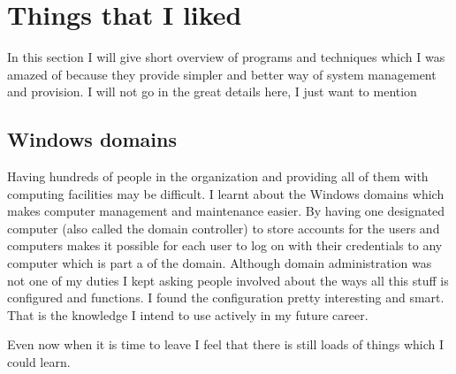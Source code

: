 \documentclass[10pt,a4paper,headinclude=true,twoside]{report}
\begin{document}
\section{Things that I liked}
In this section I will give short overview of programs and techniques which I was amazed of because they provide simpler and better way of system management and provision. I will not go in the great details here, I just want to mention 
\subsection{Windows domains}
Having hundreds of people in the organization and providing all of them with computing facilities may be difficult. I learnt about the Windows domains which makes computer management and maintenance easier. By having one designated computer (also called the domain controller) to store accounts for the users and computers makes it possible for each user to log on with their credentials to any computer which is part a of the domain. Although domain administration was not one of my duties I kept asking people involved about the ways all this stuff is configured and functions. I found the configuration pretty interesting and smart. That is the knowledge I intend to use actively in my future career.




Even now when it is time to leave I feel that there is still loads of things which I could learn.



\end{document}
